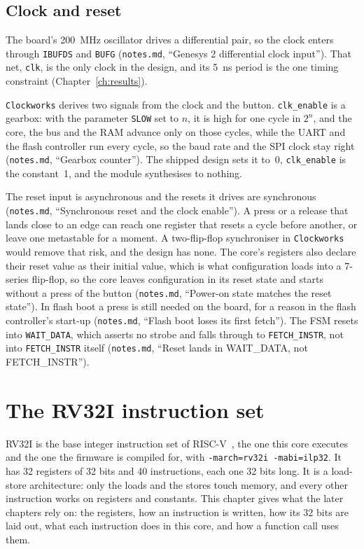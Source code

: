 \documentclass[11pt,a4paper]{report}
\newcommand{\notes}[1]{(\texttt{notes.md}, ``#1'')}
\begin{document}
\section{Clock and reset}
\label{sec:clock}

The board's 200~MHz oscillator drives a differential pair, so the clock enters through
\texttt{IBUFDS} and \texttt{BUFG} \notes{Genesys 2 differential clock input}. That net,
\texttt{clk}, is the only clock in the design, and its 5~ns period is the one timing
constraint (Chapter~\ref{ch:results}).

\texttt{Clockworks} derives two signals from the clock and the button. \texttt{clk\_enable}
is a gearbox: with the parameter \texttt{SLOW} set to $n$, it is high for one cycle in
$2^n$, and the core, the bus and the RAM advance only on those cycles, while the UART and
the flash controller run every cycle, so the baud rate and the SPI clock stay right
\notes{Gearbox counter}. The shipped design sets it to~0, \texttt{clk\_enable} is the
constant~1, and the module synthesises to nothing.

The reset input is asynchronous and the resets it drives are synchronous \notes{Synchronous
reset and the clock enable}. A press or a release that lands close to an edge can reach one
register that resets a cycle before another, or leave
one metastable for a moment. A two-flip-flop synchroniser in \texttt{Clockworks} would remove
that risk, and the design has none. The core's registers also declare their
reset value as their initial value, which is what configuration loads into a 7-series
flip-flop, so the core leaves configuration in its reset state and starts without a press of
the button \notes{Power-on state matches the reset state}. In flash boot a press is still
needed on the board, for a reason in the flash controller's start-up \notes{Flash boot loses
its first fetch}. The FSM resets into \texttt{WAIT\_DATA}, which asserts no strobe and falls
through to \texttt{FETCH\_INSTR}, not into \texttt{FETCH\_INSTR} itself \notes{Reset lands in
WAIT\_DATA, not FETCH\_INSTR}.

\chapter{The RV32I instruction set}
\label{ch:isa}

RV32I is the base integer instruction set of RISC-V~\cite{riscv-isa}, the one this core
executes and the one the firmware is compiled for, with \texttt{-march=rv32i -mabi=ilp32}. It
has 32 registers of 32 bits and 40 instructions, each one 32 bits long. It is a load-store
architecture: only the loads and the stores touch memory, and every other instruction works on
registers and constants. This chapter gives what the later chapters rely on: the registers,
how an instruction is written, how its 32 bits are laid out, what each instruction does in
this core, and how a function call uses them.
\end{document}
